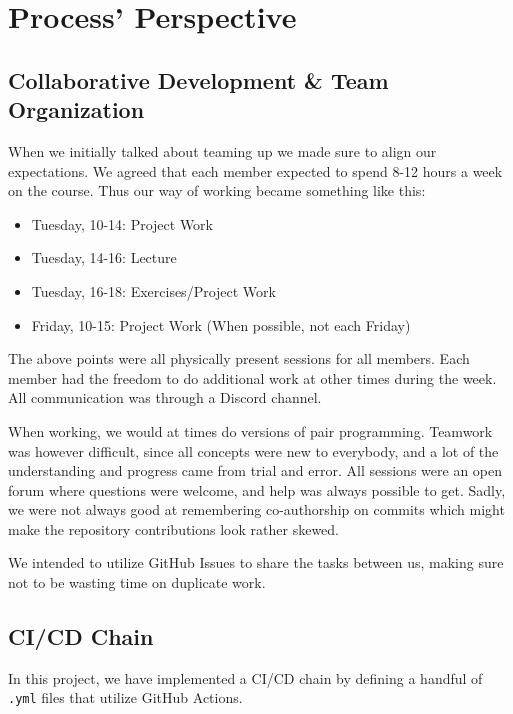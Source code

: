 \section{Process' Perspective}

\subsection{Collaborative Development \& Team Organization}

When we initially talked about teaming up we made sure to align our expectations. We agreed that each member expected to spend 8-12 hours a week on the course. Thus our way of working became something like this:
\begin{itemize}
    \item Tuesday, 10-14: Project Work
    \item Tuesday, 14-16: Lecture
    \item Tuesday, 16-18: Exercises/Project Work
    \item Friday, 10-15: Project Work (When possible, not each Friday)
\end{itemize}

The above points were all physically present sessions for all members. Each member had the freedom to do additional work at other times during the week. All communication was through a Discord channel.

When working, we would at times do versions of pair programming. Teamwork was however difficult, since all concepts were new to everybody, and a lot of the understanding and progress came from trial and error. All sessions were an open forum where questions were welcome, and help was always possible to get. Sadly, we were not always good at remembering co-authorship on commits which might make the repository contributions look rather skewed.

We intended to utilize GitHub Issues to share the tasks between us, making sure not to be wasting time on duplicate work.


\subsection{CI/CD Chain}


In this project, we have implemented a CI/CD chain by defining a handful of \texttt{.yml} files that utilize GitHub Actions. 


